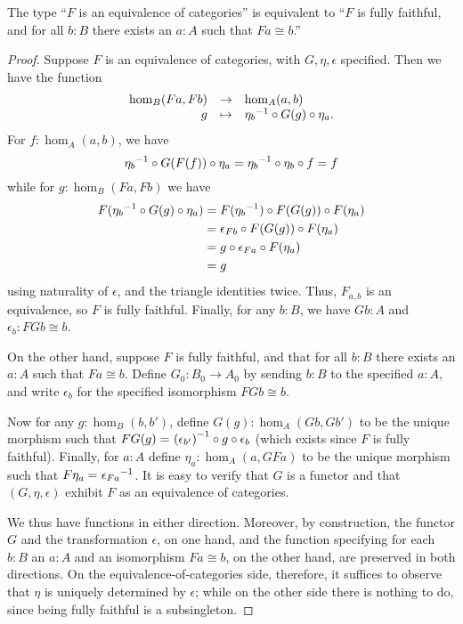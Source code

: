 \begin{lem}\label{ct:ffeso}
  The type ``$F$ is an equivalence of categories'' is equivalent to ``$F$ is fully faithful, and for all $b:B$ there exists an $a:A$ such that $Fa\cong b$.''
\end{lem}
\begin{proof}
  Suppose $F$ is an equivalence of categories, with $G,\eta,\epsilon$ specified.
  Then we have the function
  \begin{equation*}
    \begin{array}{rcl}
      \hom_B(Fa,Fb) &\to& \hom_A(a,b)\\
      g &\mapsto& {\eta_b}^{-1}\circ G(g)\circ \eta_a.
    \end{array}
  \end{equation*}
  For $f:\hom_A(a,b)$, we have
  \[ {\eta_{b}}^{-1}\circ G(F(f))\circ \eta_{a}  =
  {\eta_{b}}^{-1} \circ \eta_{b} \circ f=
  f
  \]
  while for $g:\hom_B(Fa,Fb)$ we have
  \begin{align*}
    F({\eta_b}^{-1} \circ G(g)\circ\eta_a)
    &= F({\eta_b}^{-1})\circ F(G(g))\circ F(\eta_a)\\
    &= \epsilon_{Fb}\circ F(G(g))\circ F(\eta_a)\\
    &= g\circ\epsilon_{Fa}\circ F(\eta_a)\\
    &= g
  \end{align*}
  using naturality of $\epsilon$, and the triangle identities twice.
  Thus, $F_{a,b}$ is an equivalence, so $F$ is fully faithful.
  Finally, for any $b:B$, we have $Gb:A$ and $\epsilon_b:FGb\cong b$.

  On the other hand, suppose $F$ is fully faithful, and that for all $b:B$ there exists an $a:A$ such that $Fa\cong b$.
  Define $G_0:B_0\to A_0$ by sending $b:B$ to the specified $a:A$, and write $\epsilon_b$ for the specified isomorphism $FGb\cong b$.

  Now for any $g:\hom_B(b,b')$, define $G(g):\hom_A(Gb,Gb')$ to be the unique morphism such that $FG(g) =_{} {(\epsilon_{b'})}^{-1}\circ g \circ \epsilon_b $ (which exists since $F$ is fully faithful).
  Finally, for $a:A$ define $\eta_a:\hom_A(a,GFa)$ to be the unique morphism such that $F\eta_a =_{} {\epsilon_{Fa}}^{-1}$.
  It is easy to verify that $G$ is a functor and that $(G,\eta,\epsilon)$ exhibit $F$ as an equivalence of categories.

  We thus have functions in either direction.
  Moreover, by construction, the functor $G$ and the transformation $\epsilon$, on one hand, and the function specifying for each $b:B$ an $a:A$ and an isomorphism $Fa\cong b$, on the other hand, are preserved in both directions.
  On the equivalence-of-categories side, therefore, it suffices to observe that $\eta$ is uniquely determined by $\epsilon$; while on the other side there is nothing to do, since being fully faithful is a subsingleton.
\end{proof}

